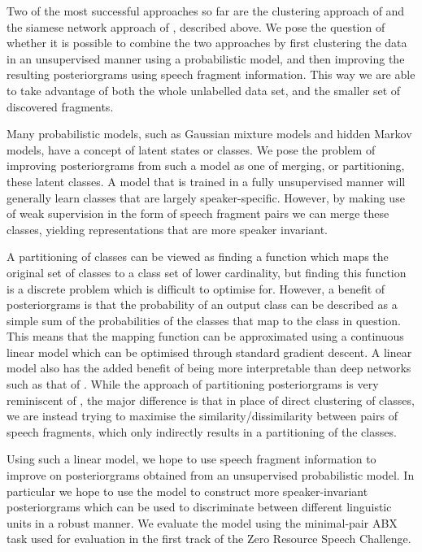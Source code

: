 Two of the most successful approaches so far are the clustering approach of \textcite{chen2015parallel} and the siamese network approach of \textcite{thiolliere2015hybrid}, described above.
We pose the question of whether it is possible to combine the two approaches by first clustering the data in an unsupervised manner using a probabilistic model, and then improving the resulting posteriorgrams using speech fragment information.
This way we are able to take advantage of both the whole unlabelled data set, and the smaller set of discovered fragments.

Many probabilistic models, such as Gaussian mixture models and hidden Markov models, have a concept of latent states or classes.
We pose the problem of improving posteriorgrams from such a model as one of merging, or partitioning, these latent classes.
A model that is trained in a fully unsupervised manner will generally learn classes that are largely speaker-specific.
However, by making use of weak supervision in the form of speech fragment pairs we can merge these classes, yielding representations that are more speaker invariant.

A partitioning of classes can be viewed as finding a function which maps the original set of classes to a class set of lower cardinality, but finding this function is a discrete problem which is difficult to optimise for.
However, a benefit of posteriorgrams is that the probability of an output class can be described as a simple sum of the probabilities of the classes that map to the class in question.
This means that the mapping function can be approximated using a continuous linear model which can be optimised through standard gradient descent.
A linear model also has the added benefit of being more interpretable than deep networks such as that of \textcite{thiolliere2015hybrid}.
While the approach of partitioning posteriorgrams is very reminiscent of \textcite{jansen2013weak}, the major difference is that in place of direct clustering of classes, we are instead trying to maximise the similarity/dissimilarity between pairs of speech fragments, which only indirectly results in a partitioning of the classes.

Using such a linear model, we hope to use speech fragment information to improve on posteriorgrams obtained from an unsupervised probabilistic model.
In particular we hope to use the model to construct more speaker-invariant posteriorgrams which can be used to discriminate between different linguistic units in a robust manner.
We evaluate the model using the minimal-pair ABX task used for evaluation in the first track of the Zero Resource Speech Challenge.
